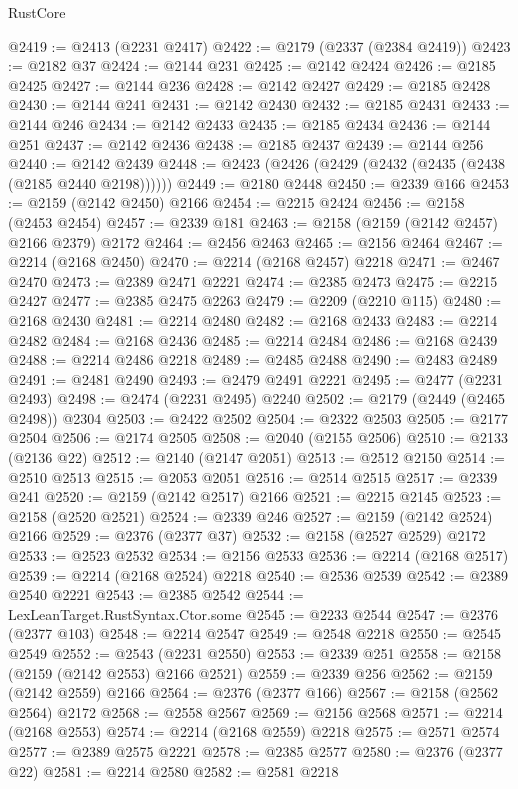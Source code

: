 \begin{lexlean}{RustCore}
\begin{coremodule}
@2419 := @2413 (@2231 @2417)
@2422 := @2179 (@2337 (@2384 @2419))
@2423 := @2182 @37
@2424 := @2144 @231
@2425 := @2142 @2424
@2426 := @2185 @2425
@2427 := @2144 @236
@2428 := @2142 @2427
@2429 := @2185 @2428
@2430 := @2144 @241
@2431 := @2142 @2430
@2432 := @2185 @2431
@2433 := @2144 @246
@2434 := @2142 @2433
@2435 := @2185 @2434
@2436 := @2144 @251
@2437 := @2142 @2436
@2438 := @2185 @2437
@2439 := @2144 @256
@2440 := @2142 @2439
@2448 := @2423 (@2426 (@2429 (@2432 (@2435 (@2438 (@2185 @2440 @2198))))))
@2449 := @2180 @2448
@2450 := @2339 @166
@2453 := @2159 (@2142 @2450) @2166
@2454 := @2215 @2424
@2456 := @2158 (@2453 @2454)
@2457 := @2339 @181
@2463 := @2158 (@2159 (@2142 @2457) @2166 @2379) @2172
@2464 := @2456 @2463
@2465 := @2156 @2464
@2467 := @2214 (@2168 @2450)
@2470 := @2214 (@2168 @2457) @2218
@2471 := @2467 @2470
@2473 := @2389 @2471 @2221
@2474 := @2385 @2473
@2475 := @2215 @2427
@2477 := @2385 @2475 @2263
@2479 := @2209 (@2210 @115)
@2480 := @2168 @2430
@2481 := @2214 @2480
@2482 := @2168 @2433
@2483 := @2214 @2482
@2484 := @2168 @2436
@2485 := @2214 @2484
@2486 := @2168 @2439
@2488 := @2214 @2486 @2218
@2489 := @2485 @2488
@2490 := @2483 @2489
@2491 := @2481 @2490
@2493 := @2479 @2491 @2221
@2495 := @2477 (@2231 @2493)
@2498 := @2474 (@2231 @2495) @2240
@2502 := @2179 (@2449 (@2465 @2498)) @2304
@2503 := @2422 @2502
@2504 := @2322 @2503
@2505 := @2177 @2504
@2506 := @2174 @2505
@2508 := @2040 (@2155 @2506)
@2510 := @2133 (@2136 @22)
@2512 := @2140 (@2147 @2051)
@2513 := @2512 @2150
@2514 := @2510 @2513
@2515 := @2053 @2051
@2516 := @2514 @2515
@2517 := @2339 @241
@2520 := @2159 (@2142 @2517) @2166
@2521 := @2215 @2145
@2523 := @2158 (@2520 @2521)
@2524 := @2339 @246
@2527 := @2159 (@2142 @2524) @2166
@2529 := @2376 (@2377 @37)
@2532 := @2158 (@2527 @2529) @2172
@2533 := @2523 @2532
@2534 := @2156 @2533
@2536 := @2214 (@2168 @2517)
@2539 := @2214 (@2168 @2524) @2218
@2540 := @2536 @2539
@2542 := @2389 @2540 @2221
@2543 := @2385 @2542
@2544 := LexLeanTarget.RustSyntax.Ctor.some
@2545 := @2233 @2544
@2547 := @2376 (@2377 @103)
@2548 := @2214 @2547
@2549 := @2548 @2218
@2550 := @2545 @2549
@2552 := @2543 (@2231 @2550)
@2553 := @2339 @251
@2558 := @2158 (@2159 (@2142 @2553) @2166 @2521)
@2559 := @2339 @256
@2562 := @2159 (@2142 @2559) @2166
@2564 := @2376 (@2377 @166)
@2567 := @2158 (@2562 @2564) @2172
@2568 := @2558 @2567
@2569 := @2156 @2568
@2571 := @2214 (@2168 @2553)
@2574 := @2214 (@2168 @2559) @2218
@2575 := @2571 @2574
@2577 := @2389 @2575 @2221
@2578 := @2385 @2577
@2580 := @2376 (@2377 @22)
@2581 := @2214 @2580
@2582 := @2581 @2218

\end{coremodule}
\end{lexlean}
